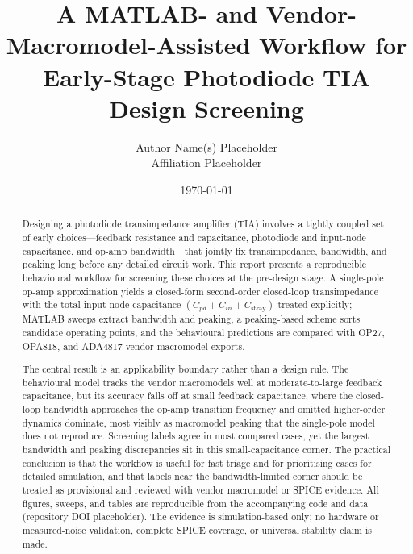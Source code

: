 \documentclass[11pt]{article}
\title{A MATLAB- and Vendor-Macromodel-Assisted Workflow for Early-Stage Photodiode TIA Design Screening}
\author{Author Name(s) Placeholder\\Affiliation Placeholder}
\date{\today}
\begin{document}
\maketitle

\begin{abstract}
Designing a photodiode transimpedance amplifier (TIA) involves a tightly coupled set of early choices---feedback resistance and capacitance, photodiode and input-node capacitance, and op-amp bandwidth---that jointly fix transimpedance, bandwidth, and peaking long before any detailed circuit work. This report presents a reproducible behavioural workflow for screening these choices at the pre-design stage. A single-pole op-amp approximation yields a closed-form second-order closed-loop transimpedance with the total input-node capacitance $(C_{pd}+C_{in}+C_{\mathrm{stray}})$ treated explicitly; MATLAB sweeps extract bandwidth and peaking, a peaking-based scheme sorts candidate operating points, and the behavioural predictions are compared with OP27, OPA818, and ADA4817 vendor-macromodel exports.

The central result is an applicability boundary rather than a design rule. The behavioural model tracks the vendor macromodels well at moderate-to-large feedback capacitance, but its accuracy falls off at small feedback capacitance, where the closed-loop bandwidth approaches the op-amp transition frequency and omitted higher-order dynamics dominate, most visibly as macromodel peaking that the single-pole model does not reproduce. Screening labels agree in most compared cases, yet the largest bandwidth and peaking discrepancies sit in this small-capacitance corner. The practical conclusion is that the workflow is useful for fast triage and for prioritising cases for detailed simulation, and that labels near the bandwidth-limited corner should be treated as provisional and reviewed with vendor macromodel or SPICE evidence. All figures, sweeps, and tables are reproducible from the accompanying code and data (repository DOI placeholder). The evidence is simulation-based only; no hardware or measured-noise validation, complete SPICE coverage, or universal stability claim is made.
\end{abstract}



\FloatBarrier

\FloatBarrier

\FloatBarrier

\FloatBarrier

\FloatBarrier

\FloatBarrier

\FloatBarrier
\end{document}
